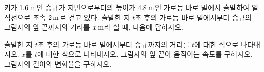 \noindent\begin{minipage}[t]{0.58\linewidth}\vspace{0pt}\raggedright 키가 $1.6\mkern3mu \mathrm{m}$인 승규가 지면으로부터의 높이가 $4.8\mkern3mu \mathrm{m}$인 가로등 바로 밑에서 출발하여 일직선으로 초속 $2\mkern3mu \mathrm{m}$로 걷고 있다. 출발한 지 $t$초 후의 가로등 바로 밑에서부터 승규의 그림자의 앞 끝까지의 거리를 $x\mkern3mu \mathrm{m}$라 할 때, 다음에 답하시오.\end{minipage}\hfill\begin{minipage}[t]{0.4\linewidth}\vspace{0pt}\centering \resizebox{\ifdim\width>\linewidth\linewidth\else\width\fi}{!}{}\end{minipage}\par
{} 출발한 지 $t$초 후의 가로등 바로 밑에서부터 승규까지의 거리를 $t$에 대한 식으로 나타내시오.
 $x$를 $t$에 대한 식으로 나타내시오.
 그림자의 앞 끝이 움직이는 속도를 구하시오.
 그림자의 길이의 변화율을 구하시오.
